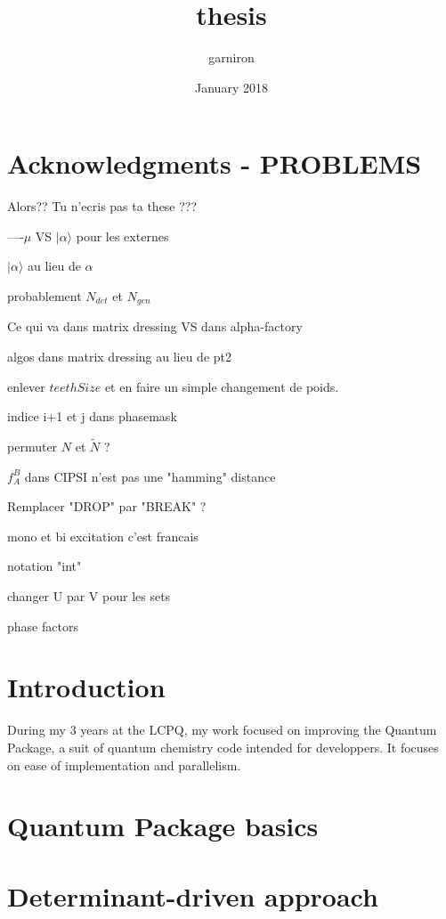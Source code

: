 \documentclass{report}
\title{thesis}
\author{garniron}
\date{January 2018}
\newcommand{\ket}[1]{| #1 \rangle}
\begin{document}
\dominitoc

\maketitle
\newpage

\chapter*{Acknowledgments - PROBLEMS}



Alors?? Tu n'ecris pas ta these ???


----$\mu$ VS $\ket \alpha$ pour les externes

$\ket \alpha$ au lieu de $\alpha$

probablement $N_{det}$ et $N_{gen}$

Ce qui va dans matrix dressing VS dans alpha-factory

algos dans matrix dressing au lieu de pt2

enlever $teethSize$ et en faire un simple changement de poids.

indice i+1 et j dans phasemask

permuter $N$ et $\tilde N$ ?

$f_A^B$ dans CIPSI n'est pas une "hamming" distance

Remplacer "DROP" par "BREAK" ?

mono et bi excitation c'est francais

notation "int"

changer U par V pour les sets

phase factors

\newpage

\tableofcontents
\newpage


\chapter{Introduction}

During my 3 years at the LCPQ, my work focused on improving the Quantum Package, a suit of quantum chemistry code intended for developpers. It focuses on ease of implementation and parallelism.

\chapter{Quantum Package basics}
\minitoc



\chapter{Determinant-driven approach}
\minitoc

\end{document}
